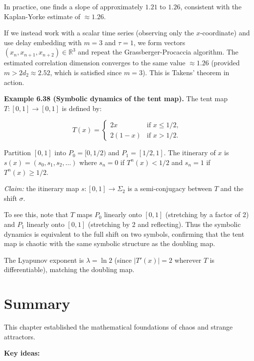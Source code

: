In practice, one finds a slope of approximately $1.21$ to $1.26$, consistent with the Kaplan-Yorke estimate of $\approx 1.26$.

If we instead work with a scalar time series (observing only the $x$-coordinate) and use delay embedding with $m = 3$ and $\tau = 1$, we form vectors $(x_n, x_{n+1}, x_{n+2}) \in \mathbb{R}^3$ and repeat the Grassberger-Procaccia algorithm. The estimated correlation dimension converges to the same value $\approx 1.26$ (provided $m > 2 d_2 \approx 2.52$, which is satisfied since $m = 3$). This is Takens' theorem in action.

\textbf{Example 6.38 (Symbolic dynamics of the tent map).} The tent map $T: [0,1] \to [0,1]$ is defined by:

\[
T(x) = \begin{cases} 2x & \text{if } x \leq 1/2, \\ 2(1-x) & \text{if } x > 1/2. \end{cases}
\]

Partition $[0,1]$ into $P_0 = [0, 1/2)$ and $P_1 = [1/2, 1]$. The itinerary of $x$ is $s(x) = (s_0, s_1, s_2, \ldots)$ where $s_n = 0$ if $T^n(x) < 1/2$ and $s_n = 1$ if $T^n(x) \geq 1/2$.

\textit{Claim:} the itinerary map $s: [0,1] \to \Sigma_2$ is a semi-conjugacy between $T$ and the shift $\sigma$.

To see this, note that $T$ maps $P_0$ linearly onto $[0,1]$ (stretching by a factor of 2) and $P_1$ linearly onto $[0,1]$ (stretching by 2 and reflecting). Thus the symbolic dynamics is equivalent to the full shift on two symbols, confirming that the tent map is chaotic with the same symbolic structure as the doubling map.

The Lyapunov exponent is $\lambda = \ln 2$ (since $|T'(x)| = 2$ wherever $T$ is differentiable), matching the doubling map.


\bigskip


\section{Summary}\label{sec:6.9}

This chapter established the mathematical foundations of chaos and strange attractors.

\textbf{Key ideas:}

